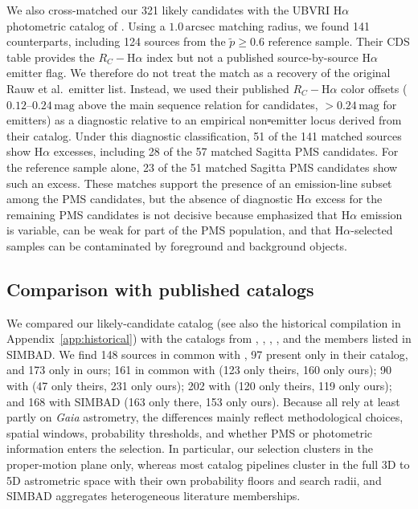 \documentclass{aa}
\providecommand{\DIFdeltex}[1]{{\protect\color{red}\sout{#1}}} %
\providecommand{\DIFdelbegin}{} %
\providecommand{\DIFdelend}{} %
\providecommand{\DIFdel}[1]{\texorpdfstring{\DIFdeltex{#1}}{}} %
\providecommand{\DIFscaledelfig}{0.5}
\newlength{\DIFdelgraphicswidth} %
\newlength{\DIFdelgraphicsheight} %
\providecommand{\DIFdelincludegraphics}[2][]{%
\sbox{\DIFdelgraphicsbox}{\DIFOincludegraphics[#1]{#2}}%
\settoboxwidth{\DIFdelgraphicswidth}{\DIFdelgraphicsbox} %
\settoboxtotalheight{\DIFdelgraphicsheight}{\DIFdelgraphicsbox} %
\scalebox{\DIFscaledelfig}{%
\parbox[b]{\DIFdelgraphicswidth}{\usebox{\DIFdelgraphicsbox}\\[-\baselineskip] \rule{\DIFdelgraphicswidth}{0em}}\llap{\resizebox{\DIFdelgraphicswidth}{\DIFdelgraphicsheight}{%
\setlength{\unitlength}{\DIFdelgraphicswidth}%
\begin{picture}(1,1)%
\thicklines\linethickness{2pt} %
{\color[rgb]{1,0,0}\put(0,0){\framebox(1,1){}}}%
{\color[rgb]{1,0,0}\put(0,0){\line( 1,1){1}}}%
{\color[rgb]{1,0,0}\put(0,1){\line(1,-1){1}}}%
\end{picture}%
}\hspace*{3pt}}} %
} %
\DeclareRobustCommand{\DIFdelbegin}{\DIFOdelbegin \let\includegraphics\DIFdelincludegraphics} %
\DeclareRobustCommand{\DIFdelend}{\DIFOaddend \let\includegraphics\DIFOincludegraphics} %
\begin{document}
We also cross-matched our 321 likely candidates with the UBVRI H$\alpha$ photometric catalog of \citet{2010AA...511A..25R}. Using a $1.0\,\mathrm{arcsec}$ matching radius, we found 141 counterparts, including 124 sources from the $\tilde{p}\geq0.6$ reference sample. Their CDS table provides the $R_C-$H$\alpha$ index but not a published source-by-source H$\alpha$ emitter flag. We therefore do not treat the match as a recovery of the original Rauw et al.\ emitter list. Instead, we used their published $R_C-$H$\alpha$ color offsets ($0.12$--$0.24\,\mathrm{mag}$ above the main sequence relation for candidates, $>0.24\,\mathrm{mag}$ for emitters) as a diagnostic relative to an empirical non\DIFdelbegin \DIFdel{-}\DIFdelend emitter locus derived from their catalog. Under this diagnostic classification, 51 of the 141 matched sources show H$\alpha$ excesses, including 28 of the 57 matched Sagitta PMS candidates. For the reference sample alone, 23 of the 51 matched Sagitta PMS candidates show such an excess. These matches support the presence of an emission-line subset among the PMS candidates, but the absence of diagnostic H$\alpha$ excess for the remaining PMS candidates is not decisive because \citet{2010AA...511A..25R} emphasized that H$\alpha$ emission is variable, can be weak for part of the PMS population, and that H$\alpha$-selected samples can be contaminated by foreground and background objects.

\subsection{Comparison with published catalogs}
We compared our likely-candidate catalog (see also the historical compilation in Appendix~\ref{app:historical}) with the catalogs from \citet{2020AA...640A...1C}, \citet{2021ApJ...923..129J}, \citet{2022ApJS..262....7H}, \citet{2024arXiv240305143H}, and the members listed in SIMBAD\@. We find 148 sources in common with \citet{2020AA...640A...1C}, 97 present only in their catalog, and 173 only in ours; 161 in common with \citet{2021ApJ...923..129J} (123 only theirs, 160 only ours); 90 with \citet{2022ApJS..262....7H} (47 only theirs, 231 only ours); 202 with \citet{2024arXiv240305143H} (120 only theirs, 119 only ours); and 168 with SIMBAD (163 only there, 153 only ours). Because all rely at least partly on \textit{Gaia} astrometry, the differences mainly reflect methodological choices, spatial windows, probability thresholds, and whether PMS or photometric information enters the selection. In particular, our selection clusters in the proper-motion plane only, whereas most catalog pipelines cluster in the full 3D to 5D astrometric space with their own probability floors and search radii, and SIMBAD aggregates heterogeneous literature memberships.
\end{document}

